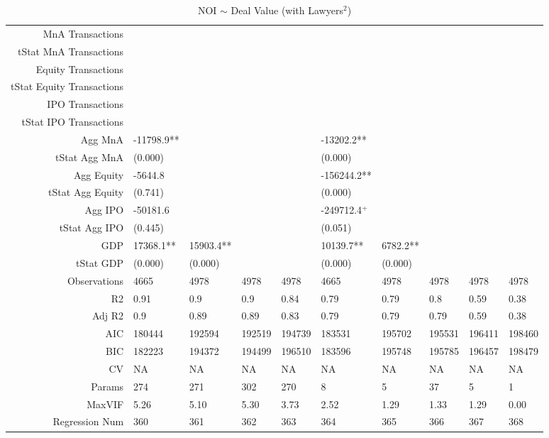 \begin{table}[ht]
\begin{tabular}{rlllllllll}
  MnA Transactions &  &  &  &  &  &  &  &  &  \\ 
  tStat MnA Transactions &  &  &  &  &  &  &  &  &  \\ 
  Equity Transactions &  &  &  &  &  &  &  &  &  \\ 
  tStat Equity Transactions &  &  &  &  &  &  &  &  &  \\ 
  IPO Transactions &  &  &  &  &  &  &  &  &  \\ 
  tStat IPO Transactions &  &  &  &  &  &  &  &  &  \\ 
  Agg MnA & -11798.9** &  &  &  & -13202.2** &  &  &  &  \\ 
  tStat Agg MnA & (0.000) &  &  &  & (0.000) &  &  &  &  \\ 
  Agg Equity & -5644.8 &  &  &  & -156244.2** &  &  &  &  \\ 
  tStat Agg Equity & (0.741) &  &  &  & (0.000) &  &  &  &  \\ 
  Agg IPO & -50181.6 &  &  &  & -249712.4$^{+}$ &  &  &  &  \\ 
  tStat Agg IPO & (0.445) &  &  &  & (0.051) &  &  &  &  \\ 
  GDP & 17368.1** & 15903.4** &  &  & 10139.7** & 6782.2** &  &  &  \\ 
  tStat GDP & (0.000) & (0.000) &  &  & (0.000) & (0.000) &  &  &  \\ 
  Observations & 4665 & 4978 & 4978 & 4978 & 4665 & 4978 & 4978 & 4978 & 4978 \\ 
  R2 & 0.91 & 0.9 & 0.9 & 0.84 & 0.79 & 0.79 & 0.8 & 0.59 & 0.38 \\ 
  Adj R2 & 0.9 & 0.89 & 0.89 & 0.83 & 0.79 & 0.79 & 0.79 & 0.59 & 0.38 \\ 
  AIC & 180444 & 192594 & 192519 & 194739 & 183531 & 195702 & 195531 & 196411 & 198460 \\ 
  BIC & 182223 & 194372 & 194499 & 196510 & 183596 & 195748 & 195785 & 196457 & 198479 \\ 
  CV & NA & NA & NA & NA & NA & NA & NA & NA & NA \\ 
  Params & 274 & 271 & 302 & 270 & 8 & 5 & 37 & 5 & 1 \\ 
  MaxVIF & 5.26 & 5.10 & 5.30 & 3.73 & 2.52 & 1.29 & 1.33 & 1.29 & 0.00 \\ 
  Regression Num & 360 & 361 & 362 & 363 & 364 & 365 & 366 & 367 & 368 \\ 
   \hline
\end{tabular}
\caption{NOI $\sim$ Deal Value (with Lawyers$^2$)} 
\end{table}
